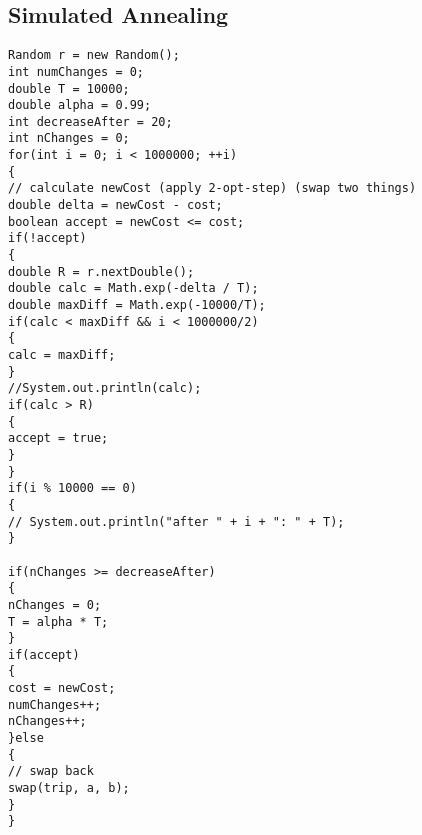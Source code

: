 \subsection{Simulated Annealing}
\begin{lstlisting}
Random r = new Random();
int numChanges = 0;
double T = 10000;
double alpha = 0.99;
int decreaseAfter = 20;
int nChanges = 0;
for(int i = 0; i < 1000000; ++i)
{
// calculate newCost (apply 2-opt-step) (swap two things)
double delta = newCost - cost;
boolean accept = newCost <= cost;
if(!accept)
{
double R = r.nextDouble();
double calc = Math.exp(-delta / T);
double maxDiff = Math.exp(-10000/T);
if(calc < maxDiff && i < 1000000/2)
{
calc = maxDiff;
}
//System.out.println(calc);
if(calc > R)
{
accept = true;
}
}
if(i % 10000 == 0)
{
// System.out.println("after " + i + ": " + T);
}

if(nChanges >= decreaseAfter)
{
nChanges = 0;
T = alpha * T;
}
if(accept)
{
cost = newCost;
numChanges++;
nChanges++;
}else
{
// swap back
swap(trip, a, b);
}
}
\end{lstlisting}